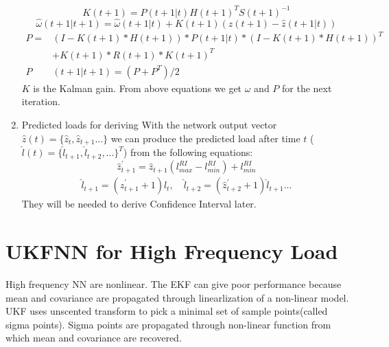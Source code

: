 \documentclass[letterpaper]{article}
\begin{document}
\begin{enumerate}
  \begin{equation} K(t+1)=P(t+1|t)H(t+1)^TS(t+1)^{-1} \end{equation}
  \begin{equation} \hat{\omega}(t+1|t+1)=\hat{\omega}(t+1|t)+K(t+1)(z(t+1)-\hat{z}(t+1|t)) \end{equation}
  \begin{equation} 
    \begin{split}
      P = & (I - K(t+1)*H(t+1))*P(t+1|t)*(I-K(t+1)*H(t+1))^T \\
          & +K(t+1)*R(t+1)*K(t+1)^T \\
      P&(t+1|t+1) = (P+P^T)/2
    \end{split}
  \end{equation}
    $K$ is the Kalman gain. From above equations we get $\omega$ and $P$ for the next iteration.

\item Predicted loads for deriving 
  With the network output vector $\hat{z}(t) = \{\hat{z}_t, \hat{z}_{t+1}...\}$ we can produce the predicted load after time $t$ ($\hat{l}(t) = \{\hat{l}_{t+1}, \hat{l}_{t+2}, ...\}^T$) from the following equations:
  \begin{equation}
    \hat{z}_{t+1}^\prime = \hat{z}_{t+1}(l_{max}^{RI}-l_{min}^{RI}) + l_{min}^{RI}
  \end{equation}
  \begin{align}
    \hat{l}_{t+1}=(\hat{z}_{t+1}^\prime+1)l_{t}, \quad \hat{l}_{t+2}=(\hat{z}_{t+2}^\prime+1)\hat{l}_{t+1}...
  \end{align}
  They will be needed to derive Confidence Interval later.
\end{enumerate}

\section*{UKFNN for High Frequency Load}
High frequency NN are nonlinear. The EKF can give poor performance because mean and covariance are propagated through linearlization of a non-linear model. UKF uses unscented transform to pick a minimal set of sample points(called sigma points). Sigma points are propagated through non-linear function from which mean and covariance are recovered.
\end{document}
